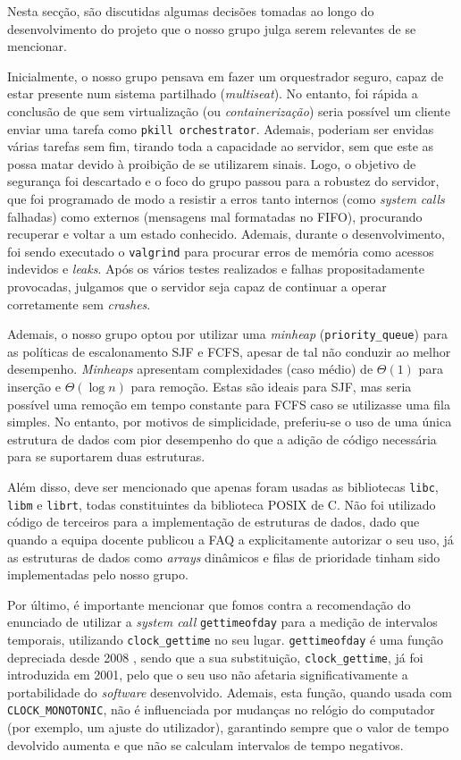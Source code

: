 \documentclass[11pt]{article}
\begin{document}
Nesta secção, são discutidas algumas decisões tomadas ao longo do desenvolvimento do projeto que o
nosso grupo julga serem relevantes de se mencionar.

Inicialmente, o nosso grupo pensava em fazer um orquestrador seguro, capaz de estar presente num
sistema partilhado (\emph{multiseat}). No entanto, foi rápida a conclusão de que sem virtualização
(ou \emph{containerização}) seria possível um cliente enviar uma tarefa como \texttt{pkill
orchestrator}. Ademais, poderiam ser envidas várias tarefas sem fim, tirando toda a capacidade ao
servidor, sem que este as possa matar devido à proibição de se utilizarem sinais. Logo, o objetivo
de segurança foi descartado e o foco do grupo passou para a robustez do servidor, que foi programado
de modo a resistir a erros tanto internos (como \emph{system calls} falhadas) como externos
(mensagens mal formatadas no FIFO), procurando recuperar e voltar a um estado conhecido. Ademais,
durante o desenvolvimento, foi sendo executado o \texttt{valgrind} \cite{valgrind} para procurar
erros de memória como acessos indevidos e \emph{leaks}. Após os vários testes realizados e falhas
propositadamente provocadas, julgamos que o servidor seja capaz de continuar a operar corretamente
sem \emph{crashes}.

Ademais, o nosso grupo optou por utilizar uma \emph{minheap} (\texttt{priority\_queue}) para as
políticas de escalonamento SJF e FCFS, apesar de tal não conduzir ao melhor desempenho.
\emph{Minheaps} apresentam complexidades (caso médio) de $\Theta(1)$ para inserção e
$\Theta(\log n)$ para remoção. Estas são ideais para SJF, mas seria possível uma remoção em tempo
constante para FCFS caso se utilizasse uma fila simples. No entanto, por motivos de simplicidade,
preferiu-se o uso de uma única estrutura de dados com pior desempenho do que a adição de código
necessária para se suportarem duas estruturas.

Além disso, deve ser mencionado que apenas foram usadas as bibliotecas \texttt{libc}, \texttt{libm}
e \texttt{librt}, todas constituintes da biblioteca POSIX de C. Não foi utilizado código de
terceiros para a implementação de estruturas de dados, dado que quando a equipa docente publicou a
FAQ a explicitamente autorizar o seu uso, já as estruturas de dados como \emph{arrays} dinâmicos e
filas de prioridade tinham sido implementadas pelo nosso grupo.

Por último, é importante mencionar que fomos contra a recomendação do enunciado de utilizar a
\emph{system call} \texttt{gettimeofday} para a medição de intervalos temporais, utilizando
\texttt{clock\_gettime} no seu lugar. \texttt{gettimeofday} é uma função depreciada desde 2008
\cite{gettimeofday}, sendo que a sua substituição, \texttt{clock\_gettime}, já foi introduzida em
2001, pelo que o seu uso não afetaria significativamente a portabilidade do \emph{software}
desenvolvido. Ademais, esta função, quando usada com \texttt{CLOCK\_MONOTONIC}, não é influenciada
por mudanças no relógio do computador (por exemplo, um ajuste do utilizador), garantindo sempre que
o valor de tempo devolvido aumenta e que não se calculam intervalos de tempo negativos.
\cite{clock_gettime}
\end{document}
